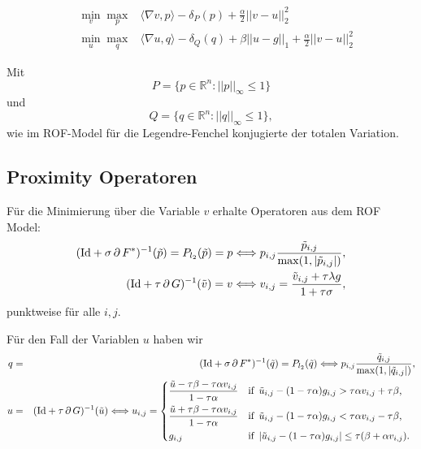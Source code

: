 \documentclass{scrreprt}
\begin{document}
			\begin{eqnarray}
				&\min\limits_{v} \max\limits_{p}& \langle \nabla v, p \rangle - \delta_{P}(p) + \frac{\alpha}{2} ||v - u||_{2}^{2} \\
				&\min\limits_{u} \max\limits_{q}& \langle \nabla u, q \rangle - \delta_{Q}(q) + \beta ||u - g||_{1} + \frac{\alpha}{2} ||v - u||_{2}^{2}
			\end{eqnarray}

		Mit
			$$
				P = \big\{ p \in \mathbb{R}^{n} : ||p||_{\infty} \le 1 \big\}
			$$
		und
			$$
				Q = \big\{ q \in \mathbb{R}^{n} : ||q||_{\infty} \le 1 \big\},
			$$
		wie im ROF-Model für die Legendre-Fenchel konjugierte der totalen Variation.
			

		\subsection{Proximity Operatoren} %
		\label{sub:proximity_operatoren}
			Für die Minimierung über die Variable $v$ erhalte Operatoren aus dem ROF Model:
				\begin{eqnarray}
	                (\textnormal{Id} + \sigma\,\partial\,F^{\ast})^{-1}(\tilde{p}) = P_{l_{2}}(\tilde{p}) = p \Longleftrightarrow p_{i,j} \frac{\tilde{p}_{i, j}}{\max(1, |\tilde{p}_{i, j}|)},\\ \label{eq:proximity_operator_f_star_v}
	                (\textnormal{Id} + \tau\,\partial\,G)^{-1}(\tilde{v}) = v \Longleftrightarrow v_{i,j} = \frac{\tilde{v}_{i,j} + \tau\lambda g}{1 + \tau\sigma}, \label{eq:proximity_operator_g_v}
	            \end{eqnarray}
	        punktweise für alle $i, j$.

		Für den Fall der Variablen $u$ haben wir
		        \begin{eqnarray}
	                q &=& (\textnormal{Id} + \sigma\,\partial\,F^{\ast})^{-1}(\tilde{q}) = P_{l_{2}}(\tilde{q}) \Longleftrightarrow p_{i,j} \frac{\tilde{q}_{i, j}}{\max(1, |\tilde{q}_{i, j}|)},\notag \\
	                u &=& (\textnormal{Id} + \tau\,\partial\,G)^{-1}(\tilde{u}) \Longleftrightarrow u_{i, j} = 
	                    \begin{dcases*}
	                        \frac{\tilde{u} - \tau \beta - \tau \alpha v_{i,j}}{1 - \tau \alpha} & \textnormal{if\, $\tilde{u}_{i,j} - (1 - \tau\alpha)g_{i,j} > \tau\alpha v_{i,j} + \tau\beta$,} \\
	                        \frac{\tilde{u} + \tau \beta - \tau \alpha v_{i,j}}{1 - \tau \alpha} & \textnormal{if\, $\tilde{u}_{i,j} - (1 - \tau\alpha)g_{i,j} < \tau\alpha v_{i,j} - \tau\beta$,} \\
	                        g_{i, j} & \textnormal{if\, $|\tilde{u}_{i,j} - (1 - \tau\alpha)g_{i,j}| \le \tau (\beta + \alpha v_{i, j})$}.
	                    \end{dcases*}\notag
	            \end{eqnarray}


\end{document}
